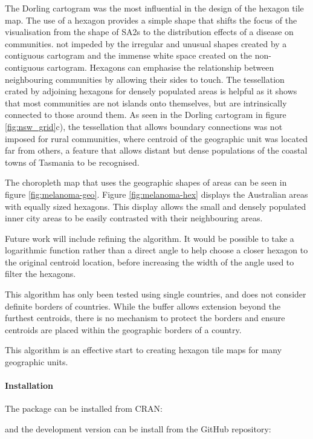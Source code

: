 The Dorling cartogram was the most influential in the design of the
hexagon tile map. The use of a hexagon provides a simple shape that
shifts the focus of the visualisation from the shape of SA2s to the
distribution effects of a disease on communities. not impeded by the
irregular and unusual shapes created by a contiguous cartogram and the
immense white space created on the non-contiguous cartogram. Hexagons
can emphasise the relationship between neighbouring communities by
allowing their sides to touch. The tessellation crated by adjoining
hexagons for densely populated areas is helpful as it shows that most
communities are not islands onto themselves, but are intrinsically
connected to those around them. As seen in the Dorling cartogram in
figure \ref{fig:nsw_grid}c), the tessellation that allows boundary
connections was not imposed for rural communities, where centroid of the
geographic unit was located far from others, a feature that allows
distant but dense populations of the coastal towns of Tasmania to be
recognised.

The choropleth map that uses the geographic shapes of areas can be seen
in figure \ref{fig:melanoma-geo}. Figure \ref{fig:melanoma-hex} displays
the Australian areas with equally sized hexagons. This display allows
the small and densely populated inner city areas to be easily contrasted
with their neighbouring areas.

Future work will include refining the algorithm. It would be possible to
take a logarithmic function rather than a direct angle to help choose a
closer hexagon to the original centroid location, before increasing the
width of the angle used to filter the hexagons.

This algorithm has only been tested using single countries, and does not
consider definite borders of countries. While the buffer allows
extension beyond the furthest centroids, there is no mechanism to
protect the borders and ensure centroids are placed within the
geographic borders of a country.

This algorithm is an effective start to creating hexagon tile maps for
many geographic units.

\hypertarget{installation}{%
\paragraph{Installation}\label{installation}}

The package can be installed from CRAN:

and the development version can be install from the GitHub repository:

